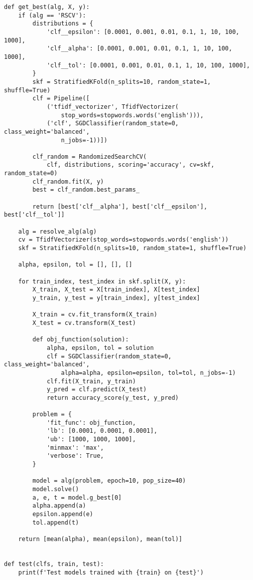 \begin{lstlisting}
def get_best(alg, X, y):
    if (alg == 'RSCV'):
        distributions = {
            'clf__epsilon': [0.0001, 0.001, 0.01, 0.1, 1, 10, 100, 1000],
            'clf__alpha': [0.0001, 0.001, 0.01, 0.1, 1, 10, 100, 1000],
            'clf__tol': [0.0001, 0.001, 0.01, 0.1, 1, 10, 100, 1000],
        }
        skf = StratifiedKFold(n_splits=10, random_state=1, shuffle=True)
        clf = Pipeline([
            ('tfidf_vectorizer', TfidfVectorizer(
                stop_words=stopwords.words('english'))),
            ('clf', SGDClassifier(random_state=0, class_weight='balanced', 
                n_jobs=-1))])

        clf_random = RandomizedSearchCV(
            clf, distributions, scoring='accuracy', cv=skf, random_state=0)
        clf_random.fit(X, y)
        best = clf_random.best_params_

        return [best['clf__alpha'], best['clf__epsilon'], best['clf__tol']]

    alg = resolve_alg(alg)
    cv = TfidfVectorizer(stop_words=stopwords.words('english'))
    skf = StratifiedKFold(n_splits=10, random_state=1, shuffle=True)

    alpha, epsilon, tol = [], [], []

    for train_index, test_index in skf.split(X, y):
        X_train, X_test = X[train_index], X[test_index]
        y_train, y_test = y[train_index], y[test_index]

        X_train = cv.fit_transform(X_train)
        X_test = cv.transform(X_test)

        def obj_function(solution):
            alpha, epsilon, tol = solution
            clf = SGDClassifier(random_state=0, class_weight='balanced', 
                alpha=alpha, epsilon=epsilon, tol=tol, n_jobs=-1)
            clf.fit(X_train, y_train)
            y_pred = clf.predict(X_test)
            return accuracy_score(y_test, y_pred)

        problem = {
            'fit_func': obj_function,
            'lb': [0.0001, 0.0001, 0.0001],
            'ub': [1000, 1000, 1000],
            'minmax': 'max',
            'verbose': True,
        }

        model = alg(problem, epoch=10, pop_size=40)
        model.solve()
        a, e, t = model.g_best[0]
        alpha.append(a)
        epsilon.append(e)
        tol.append(t)

    return [mean(alpha), mean(epsilon), mean(tol)]


def test(clfs, train, test):
    print(f'Test models trained with {train} on {test}')


\end{lstlisting}
